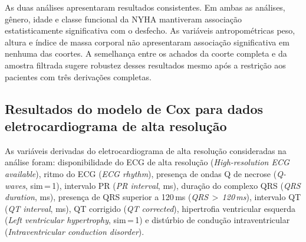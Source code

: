 \FloatBarrier

As duas análises apresentaram resultados consistentes. Em ambas as análises, gênero, idade e classe funcional da NYHA mantiveram associação estatisticamente significativa com o desfecho. As variáveis antropométricas peso, altura e índice de massa corporal não apresentaram associação significativa em nenhuma das coortes. A semelhança entre os achados da coorte completa e da amostra filtrada sugere robustez desses resultados mesmo após a restrição aos pacientes com três derivações completas.


\subsection{Resultados do modelo de Cox para dados eletrocardiograma de alta resolução}

As variáveis derivadas do eletrocardiograma de alta resolução consideradas
na análise foram: disponibilidade do ECG de alta resolução
(\textit{High-resolution ECG available}), ritmo do ECG (\textit{ECG rhythm}),
presença de ondas Q de necrose (\textit{Q-waves}, sim\,=\,1), intervalo PR
(\textit{PR interval}, ms), duração do complexo QRS (\textit{QRS duration},
ms), presença de QRS superior a 120\,ms (\textit{QRS\,$>$\,120\,ms}),
intervalo QT (\textit{QT interval}, ms), QT corrigido (\textit{QT corrected}),
hipertrofia ventricular esquerda (\textit{Left ventricular hypertrophy}, sim\,=\,1) e distúrbio de condução intraventricular (\textit{Intraventricular conduction disorder}).

